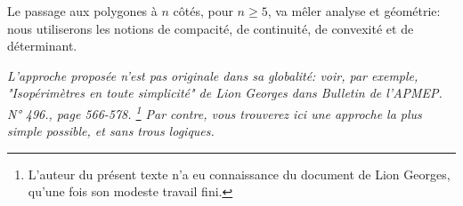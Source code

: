Le passage aux polygones à $n$ côtés, pour $n \geq 5$, va mêler analyse et géométrie: nous utiliserons les notions de compacité, de continuité, de convexité  et de déterminant.


\begin{tcolorbox}
    \itshape\small
    L'approche proposée n'est pas originale dans sa globalité: voir, par exemple, "Isopérimètres en toute simplicité" de Lion Georges dans Bulletin de l'APMEP. N° 496., page 566-578.%
    \footnote{
        L'auteur du présent texte n'a eu connaissance du document de Lion Georges, qu'une fois son modeste travail fini.
    }
    Par contre, vous trouverez ici une approche la plus simple possible, et sans trous logiques.
\end{tcolorbox}
